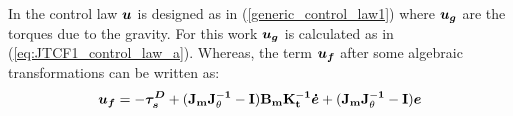 In \cite{kugi2008passivity} the control law ${ \boldsymbol {u}}$ is designed as in (\ref{generic_control_law1}) where ${ \boldsymbol {u_g}}$ are the torques due to the gravity. For this work ${ \boldsymbol {u_g}}$ is calculated as in (\ref{eq:JTCF1_control_law_a}). Whereas, the term ${ \boldsymbol {u_f}}$ after some algebraic transformations can be written as:
%
%
\begin{equation}
\label{control_law_Kugi_2}
\vects{u_f} =  -\vects{\tau^D_s} + (\vectm{J_m} \vectm{J^{-1}_{\theta}} - \vectm{I}) \vectm{B_m} \vectm{K^{-1}_t} \vects{\dot{e}} + (\vectm{J_m} \vectm{J^{-1}_{\theta}} - \vectm{I}) \vects{e}
\end{equation}


%
%
%
%


